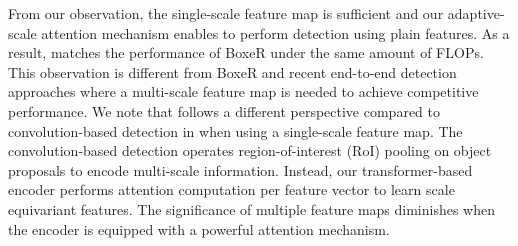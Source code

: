     From our observation, the single-scale feature map is sufficient and our adaptive-scale attention mechanism enables \ours to perform detection using plain features. As a result, \ours matches the performance of BoxeR under the same amount of FLOPs. This observation is different from BoxeR and recent end-to-end detection approaches \citep{zhu2021deformable,cheng2022mask2former} where a multi-scale feature map is needed to achieve competitive performance. We note that \ours follows a different perspective compared to convolution-based detection in \citep{chen2022uvit} when using a single-scale feature map. The convolution-based detection operates region-of-interest (RoI) pooling on object proposals to encode multi-scale information. Instead, our transformer-based encoder performs attention computation per feature vector to learn scale equivariant features. The significance of multiple feature maps diminishes when the encoder is equipped with a powerful attention mechanism.
    
    
